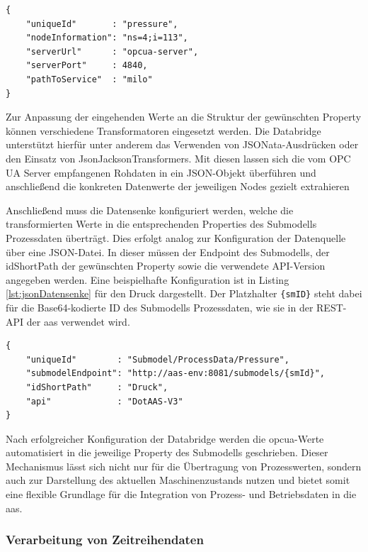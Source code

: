 \begin{lstlisting}[style=jsonstyle, caption={Beispielhafte JSON-Konfiguration einer Datenquelle}, label={lst:jsonDatenquelle}]
{
    "uniqueId"       : "pressure",
    "nodeInformation": "ns=4;i=113",
    "serverUrl"      : "opcua-server",
    "serverPort"     : 4840,
    "pathToService"  : "milo"
}
\end{lstlisting}

Zur Anpassung der eingehenden Werte an die Struktur der gewünschten Property können verschiedene Transformatoren eingesetzt werden. 
Die Databridge unterstützt hierfür unter anderem das Verwenden von JSONata-Ausdrücken oder den Einsatz von JsonJacksonTransformers. 
Mit diesen lassen sich die vom OPC UA Server empfangenen Rohdaten in ein JSON-Objekt überführen und anschließend die konkreten Datenwerte der jeweiligen Nodes gezielt extrahieren

Anschließend muss die Datensenke konfiguriert werden, welche die transformierten Werte in die entsprechenden Properties des Submodells Prozessdaten überträgt.
Dies erfolgt analog zur Konfiguration der Datenquelle über eine JSON-Datei.
In dieser müssen der Endpoint des Submodells, der idShortPath der gewünschten Property sowie die verwendete API-Version angegeben werden.
Eine beispielhafte Konfiguration ist in Listing \ref{lst:jsonDatensenke} für den Druck dargestellt.
Der Platzhalter \texttt{\{smID\}} steht dabei für die Base64-kodierte ID des Submodells Prozessdaten, wie sie in der REST-API der \acs{aas} verwendet wird.

\begin{lstlisting}[style=jsonstyle, caption={Beispielhafte JSON-Konfiguration einer Datensenke}, label={lst:jsonDatensenke}]
{
    "uniqueId"        : "Submodel/ProcessData/Pressure",
    "submodelEndpoint": "http://aas-env:8081/submodels/{smId}",
    "idShortPath"     : "Druck",
    "api"             : "DotAAS-V3"
}
\end{lstlisting}

Nach erfolgreicher Konfiguration der Databridge werden die \acs{opcua}-Werte automatisiert in die jeweilige Property des Submodells geschrieben. 
Dieser Mechanismus lässt sich nicht nur für die Übertragung von Prozesswerten, sondern auch zur Darstellung des aktuellen Maschinenzustands nutzen und bietet somit eine flexible Grundlage für die Integration von Prozess- und Betriebsdaten in die \acs{aas}.

\subsubsection{Verarbeitung von Zeitreihendaten}

